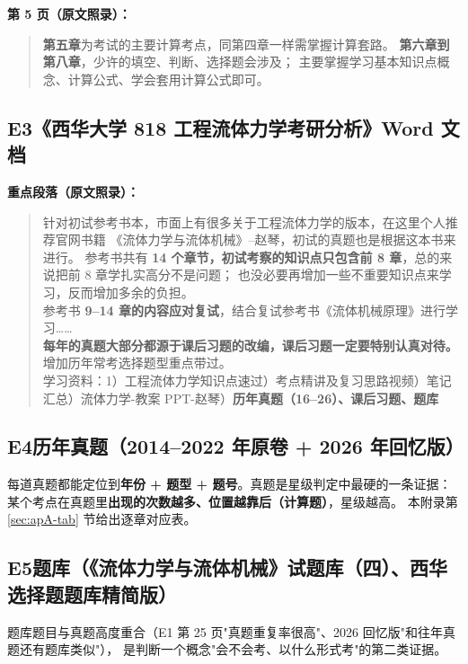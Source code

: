 \noindent\textbf{第 5 页（原文照录）：}

\begin{quote}\small
\textbf{第五章}为考试的主要计算考点，同第四章一样需掌握计算套路。
\textbf{第六章到第八章}，少许的填空、判断、选择题会涉及；
主要掌握学习基本知识点概念、计算公式、学会套用计算公式即可。
\end{quote}

\subsection*{E3\quad《西华大学 818 工程流体力学考研分析》Word 文档}

\noindent\textbf{重点段落（原文照录）：}

\begin{quote}\small
针对初试参考书本，市面上有很多关于工程流体力学的版本，在这里个人推荐官网书籍
《流体力学与流体机械》--赵琴，初试的真题也是根据这本书来进行。
参考书共有 \textbf{14 个章节，初试考察的知识点只包含前 8 章}，总的来说把前 8 章学扎实高分不是问题；
也没必要再增加一些不重要知识点来学习，反而增加多余的负担。\\
参考书 \textbf{9--14 章的内容应对复试}，结合复试参考书《流体机械原理》进行学习……\\[4pt]
\textbf{每年的真题大部分都源于课后习题的改编，课后习题一定要特别认真对待。}
增加历年常考选择题型重点带过。\\[4pt]
学习资料：1）工程流体力学知识点速过）考点精讲及复习思路视频）笔记汇总）流体力学-教案 PPT-赵琴）\textbf{历年真题（16--26）、课后习题、题库}
\end{quote}

\subsection*{E4\quad 历年真题（2014--2022 年原卷 + 2026 年回忆版）}

\noindent 每道真题都能定位到\textbf{年份 + 题型 + 题号}。真题是星级判定中最硬的一条证据：
某个考点在真题里\textbf{出现的次数越多、位置越靠后（计算题）}，星级越高。
本附录第 \ref{sec:apA-tab} 节给出逐章对应表。

\subsection*{E5\quad 题库（《流体力学与流体机械》试题库（四）、西华选择题题库精简版）}

\noindent 题库题目与真题高度重合（E1 第 25 页"真题重复率很高"、2026 回忆版"和往年真题还有题库类似"），
是判断一个概念"会不会考、以什么形式考"的第二类证据。

